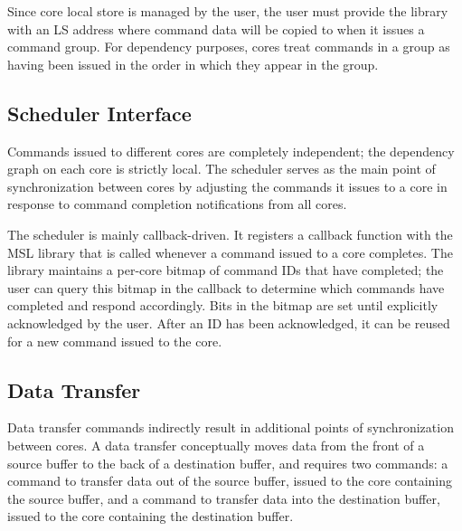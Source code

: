 Since core local store is managed by the user, the user must provide
the library with an LS address where command data will be copied to
when it issues a command group. For dependency purposes, cores treat
commands in a group as having been issued in the order in which they appear in
the group. 

\subsection{Scheduler Interface}

Commands issued to different cores are completely independent; the
dependency graph on each core is strictly local. The scheduler serves
as the main point of synchronization between cores by adjusting the
commands it issues to a core in response to command completion
notifications from all cores.

The scheduler is mainly callback-driven. It registers a callback
function with the MSL library that is called whenever a command issued
to a core completes. The library maintains a per-core bitmap of
command IDs that have completed; the user can query this bitmap in the
callback to determine which commands have completed and respond
accordingly. Bits in the bitmap are set until explicitly acknowledged
by the user. After an ID has been acknowledged, it can be reused for
a new command issued to the core.



\subsection{Data Transfer}

Data transfer commands indirectly result in additional points of
synchronization between cores. A data transfer conceptually moves
data from the front of a source buffer to the back of a destination
buffer, and requires two commands: a command to transfer data out of
the source buffer, issued to the core containing the source
buffer, and a command to transfer data into the destination buffer,
issued to the core containing the destination buffer. 

